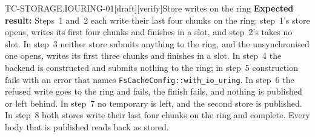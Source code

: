 \begin{requirement}{TC-STORAGE.IOURING-01}[draft][verify]{Store writes on the ring}
  \textbf{Expected result:} Steps~1 and~2 each write their last four chunks
  on the ring; step~1's store opens, writes its first four chunks and
  finishes in a slot, and step~2's takes no slot. In step~3 neither store
  submits anything to the ring, and the unsynchronised one opens, writes its
  first three chunks and finishes in a slot. In step~4 the backend is
  constructed and submits nothing to the ring; in step~5 construction fails
  with an error that names \texttt{FsCacheConfig::with\_io\_uring}. In
  step~6 the refused write goes to the ring and fails, the finish fails, and
  nothing is published or left behind. In step~7 no temporary is left, and
  the second store is published. In step~8 both stores write their last four
  chunks on the ring and complete. Every body that is published reads back
  as stored.



\end{requirement}

